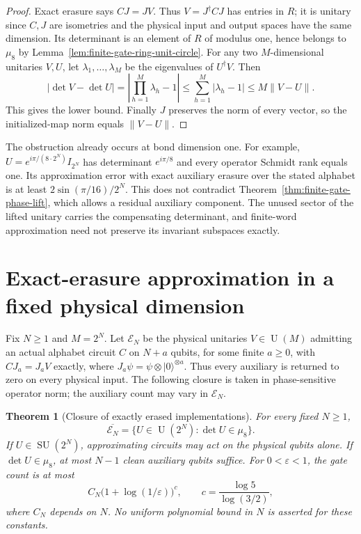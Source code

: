 \documentclass[11pt]{article}
\newtheorem{theorem}{Theorem}
\begin{document}
\begin{proof}
Exact erasure says $CJ=JV$. Thus $V=J^\dagger CJ$ has entries in $R$;
it is unitary since $C,J$ are isometries and the physical input and output
spaces have the same dimension. Its determinant is an element of $R$ of
modulus one, hence belongs to $\mu_8$ by
Lemma~\ref{lem:finite-gate-ring-unit-circle}.
For any two $M$-dimensional unitaries $V,U$, let $\lambda_1,\ldots,\lambda_M$
be the eigenvalues of $U^\dagger V$. Then
\begin{equation}
 |\det V-\det U|
 =\left|\prod_{h=1}^M\lambda_h-1\right|
 \leq\sum_{h=1}^M|\lambda_h-1|
 \leq M\|V-U\|.
\end{equation}
This gives the lower bound. Finally $J$ preserves the norm of every vector,
so the initialized-map norm equals $\|V-U\|$.
\end{proof}

The obstruction already occurs at bond dimension one. For example,
$U=e^{i\pi/(8\cdot2^N)}I_{2^N}$ has determinant $e^{i\pi/8}$ and
every operator Schmidt rank equals one. Its approximation error with exact auxiliary erasure over the stated alphabet is at least
$2\sin(\pi/16)/2^N$. This does not contradict
Theorem~\ref{thm:finite-gate-phase-lift}, which allows a residual auxiliary
component. The unused sector of the lifted unitary carries the compensating
determinant, and finite-word approximation need not preserve its invariant
subspaces exactly.

\section{Exact-erasure approximation in a fixed physical dimension}

Fix $N\geq1$ and $M=2^N$. Let $\mathcal E_N$ be the physical unitaries
$V\in\operatorname{U}(M)$ admitting an actual alphabet circuit $C$ on
$N+a$ qubits, for some finite $a\geq0$, with $CJ_a=J_aV$ exactly, where
$J_a\psi=\psi\otimes|0\rangle^{\otimes a}$. Thus every auxiliary is
returned to zero on every physical input. The following closure is taken
in phase-sensitive operator norm; the auxiliary count may vary in
$\mathcal E_N$.

\begin{theorem}[Closure of exactly erased implementations]
\label{thm:finite-gate-clean-closure}
For every fixed $N\geq1$,
\[
 \overline{\mathcal E_N}
 =\{U\in\operatorname{U}(2^N):\det U\in\mu_8\}.
\]
If $U\in\operatorname{SU}(2^N)$, approximating circuits may act on the
physical qubits alone. If $\det U\in\mu_8$, at most $N-1$ clean auxiliary
qubits suffice. For $0<\varepsilon<1$, the gate count is at most
\[
 C_N\bigl(1+\log(1/\varepsilon)\bigr)^c,
 \qquad c=\frac{\log5}{\log(3/2)},
\]
where $C_N$ depends on $N$. No uniform polynomial bound in $N$ is asserted
for these constants.
\end{theorem}
\end{document}
